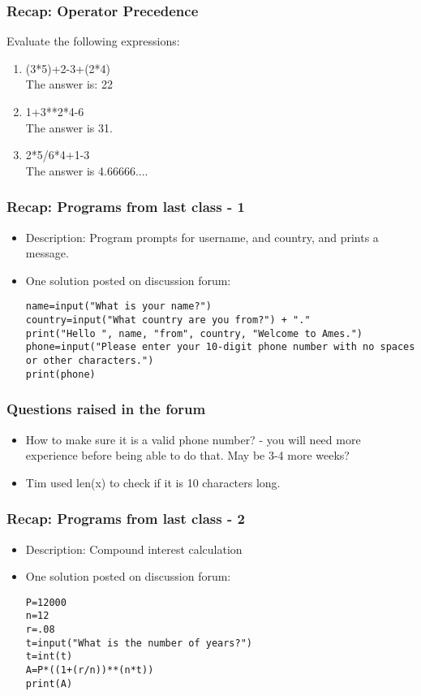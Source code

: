 \documentclass{beamer}
\begin{document}
\begin{frame}
\frametitle{Recap: Operator Precedence}
Evaluate the following expressions:
\begin{enumerate}
\item (3*5)+2-3+(2*4) \pause
\\ The answer is: 22
\item 1+3**2*4-6 \pause
\\ The answer is 31.
\item 2*5/6*4+1-3
\\ The answer is 4.66666....
\end{enumerate}
\end{frame}

\begin{frame}[fragile]
\frametitle{Recap: Programs from last class - 1}
\begin{itemize}
\item Description: Program prompts for username, and country, and prints a message.
\item One solution posted on discussion forum:
\scriptsize
\begin{verbatim}
name=input("What is your name?")
country=input("What country are you from?") + "."
print("Hello ", name, "from", country, "Welcome to Ames.")
phone=input("Please enter your 10-digit phone number with no spaces or other characters.")
print(phone)
\end{verbatim}
\end{itemize}
\end{frame}

\begin{frame}
\frametitle{Questions raised in the forum}
\begin{itemize}
\item How to make sure it is a valid phone number? - you will need more experience before being able to do that. May be 3-4 more weeks?
\item Tim used len(x) to check if it is 10 characters long. 
\end{itemize}
\end{frame}

\begin{frame}[fragile]
\frametitle{Recap: Programs from last class - 2}
\begin{itemize}
\item Description: Compound interest calculation
\item One solution posted on discussion forum: \scriptsize
\begin{verbatim}
P=12000
n=12
r=.08
t=input("What is the number of years?")
t=int(t)
A=P*((1+(r/n))**(n*t))
print(A)
\end{verbatim}
\end{itemize}
\end{frame}
\end{document}
